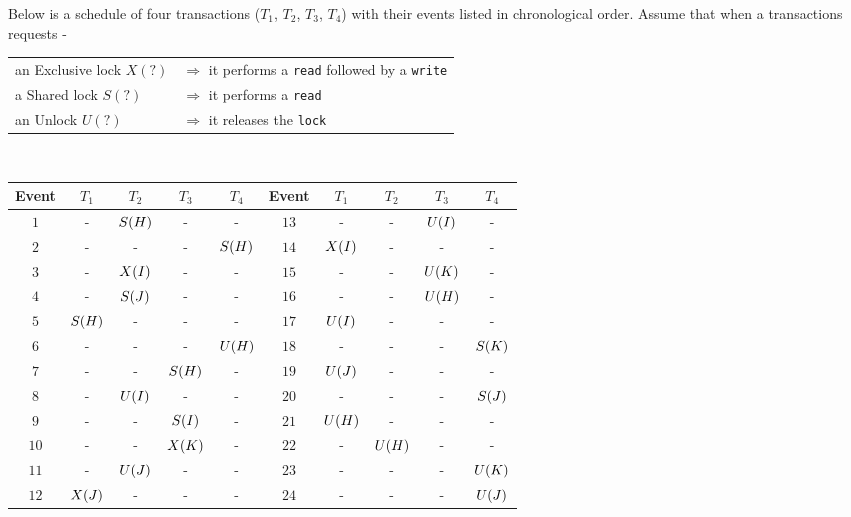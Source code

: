 


\question Below is a schedule of four transactions ($T_1$, $T_2$, 
$T_3$, $T_4$) with their events listed in chronological order. 
Assume that when a transactions requests -\\
\watchout
\begin{tabular}{ll}
an Exclusive lock $X(?)$ &$\Rightarrow$ it performs a \texttt{read} followed by a \texttt{write} \\
a  Shared lock $S(?)$    &$\Rightarrow$ it performs a \texttt{read} \\
an Unlock $U(?)$         &$\Rightarrow$ it releases the \texttt{lock} \\
\end{tabular}
\\
\begin{tabular}{|c|c|c|c|c||c|c|c|c|c|}
  \hline
  Event & $T_1$ & $T_2$ & $T_3$ & $T_4$ &Event & $T_1$ & $T_2$ & $T_3$ & $T_4$ \\
  \hline
  $1$   & -       & $S(H)$& -       & -       &$13$  & -       & -       & $U(I)$& -       \\
  $2$   & -       & -       & -       & $S(H)$&$14$  & $X(I)$& -       & -       & -       \\
  $3$   & -       & $X(I)$& -       & -       &$15$  & -       & -       & $U(K)$& -       \\
  $4$   & -       & $S(J)$& -       & -       &$16$  & -       & -       & $U(H)$& -       \\
  $5$   & $S(H)$& -       & -       & -       &$17$  & $U(I)$& -       & -       & -       \\
  $6$   & -       & -       & -       & $U(H)$&$18$  & -       & -       & -       & $S(K)$\\
  $7$   & -       & -       & $S(H)$& -       &$19$  & $U(J)$& -       & -       & -       \\
  $8$   & -       & $U(I)$& -       & -       &$20$  & -       & -       & -       & $S(J)$\\
  $9$   & -       & -       & $S(I)$& -       &$21$  & $U(H)$& -       & -       & -       \\
  $10$  & -       & -       & $X(K)$& -       &$22$  & -       & $U(H)$& -       & -       \\
  $11$  & -       & $U(J)$& -       & -       &$23$  & -       & -       & -       & $U(K)$\\
  $12$  & $X(J)$& -       & -       & -       &$24$  & -       & -       & -       & $U(J)$\\
  \hline
\end{tabular}
